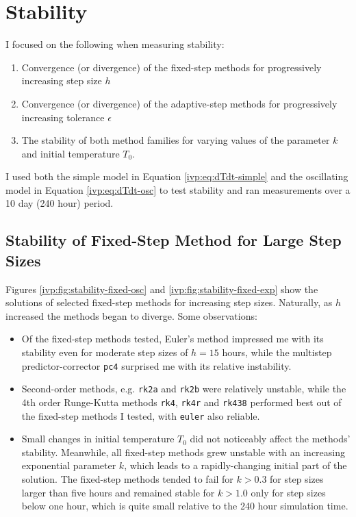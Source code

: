 \documentclass[11pt, a4paper]{article}
\begin{document}
\section{Stability}
I focused on the following when measuring stability:
\begin{enumerate}
	\item Convergence (or divergence) of the fixed-step methods for progressively increasing step size $ h $
	
	\item Convergence (or divergence) of the adaptive-step methods for progressively increasing tolerance $ \epsilon $
	
	\item The stability of both method families for varying values of the parameter $ k $ and initial temperature $ T_{0} $. 
	
\end{enumerate}
I used both the simple model in Equation \ref{ivp:eq:dTdt-simple} and the oscillating model in Equation \ref{ivp:eq:dTdt-osc} to test stability and ran measurements over a 10 day (240 hour) period.

\subsection{Stability of Fixed-Step Method for Large Step Sizes}
Figures \ref{ivp:fig:stability-fixed-osc} and \ref{ivp:fig:stability-fixed-exp} show the solutions of selected fixed-step methods for increasing step sizes. Naturally, as $ h $ increased the methods began to diverge. Some observations:
\begin{itemize}
	\item Of the fixed-step methods tested, Euler's method impressed me with its stability even for moderate step sizes of $ h = 15 $ hours, while the multistep predictor-corrector \texttt{pc4} surprised me with its relative instability. 
	
	\item  Second-order methods, e.g. \texttt{rk2a} and \texttt{rk2b} were relatively unstable, while the 4th order Runge-Kutta methods \texttt{rk4}, \texttt{rk4r} and \texttt{rk438} performed best out of the fixed-step methods I tested, with \texttt{euler} also reliable.
	
	\item Small changes in initial temperature $ T_{0} $ did not noticeably affect the methods' stability. Meanwhile, all fixed-step methods grew unstable with an increasing exponential parameter $ k $, which leads to a rapidly-changing initial part of the solution. The fixed-step methods tended to fail for $ k > 0.3 $ for step sizes larger than five hours and remained stable for $ k > 1.0 $ only for step sizes below one hour, which is quite small relative to the 240 hour simulation time.
\end{itemize}
\end{document}
